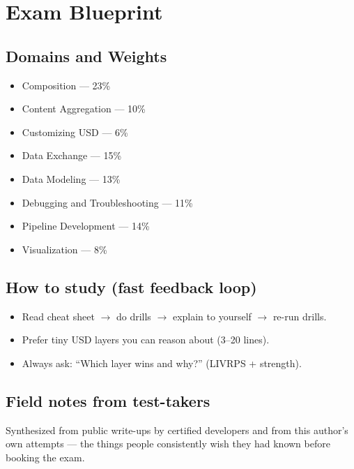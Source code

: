 \chapter{Exam Blueprint}
\section{Domains and Weights}
\begin{itemize}[leftmargin=*]
  \item Composition — 23\%
  \item Content Aggregation — 10\%
  \item Customizing USD — 6\%
  \item Data Exchange — 15\%
  \item Data Modeling — 13\%
  \item Debugging and Troubleshooting — 11\%
  \item Pipeline Development — 14\%
  \item Visualization — 8\%
\end{itemize}

\section{How to study (fast feedback loop)}
\begin{itemize}[leftmargin=*]
  \item Read cheat sheet $\rightarrow$ do drills $\rightarrow$ explain to yourself $\rightarrow$ re-run drills.
  \item Prefer tiny USD layers you can reason about (3–20 lines).
  \item Always ask: “Which layer wins and why?” (LIVRPS + strength).
\end{itemize}

\section{Field notes from test-takers}
Synthesized from public write-ups by certified developers and from this
author's own attempts --- the things people consistently wish they had known
before booking the exam.

